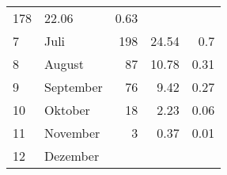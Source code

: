 \begin{longtable}{lXrrr}
       \num{178} &
       \num[round-mode=places,round-precision=2]{22,06} &
         \num[round-mode=places,round-precision=2]{0,63} \\

     7 &
     \multicolumn{1}{X}{ Juli   } &


       \num{198} &
       \num[round-mode=places,round-precision=2]{24,54} &
         \num[round-mode=places,round-precision=2]{0,7} \\

     8 &
     \multicolumn{1}{X}{ August   } &


       \num{87} &
       \num[round-mode=places,round-precision=2]{10,78} &
         \num[round-mode=places,round-precision=2]{0,31} \\

     9 &
     \multicolumn{1}{X}{ September   } &


       \num{76} &
       \num[round-mode=places,round-precision=2]{9,42} &
         \num[round-mode=places,round-precision=2]{0,27} \\

     10 &
     \multicolumn{1}{X}{ Oktober   } &


       \num{18} &
       \num[round-mode=places,round-precision=2]{2,23} &
         \num[round-mode=places,round-precision=2]{0,06} \\

     11 &
     \multicolumn{1}{X}{ November   } &


       \num{3} &
       \num[round-mode=places,round-precision=2]{0,37} &
         \num[round-mode=places,round-precision=2]{0,01} \\

     12 &
     \multicolumn{1}{X}{ Dezember   } &



\end{longtable}
